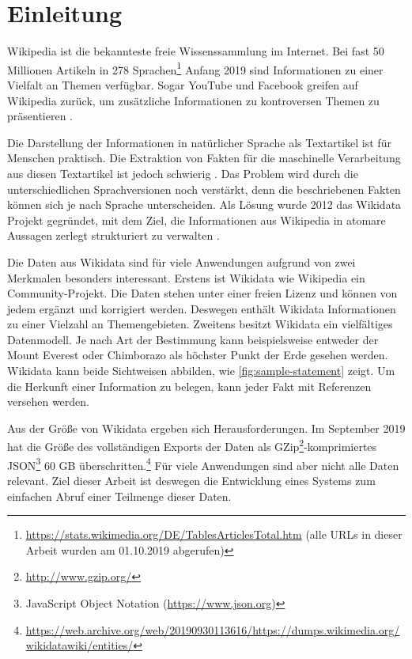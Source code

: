 %
\chapter{Einleitung}
\label{sec:intro}
Wikipedia ist die bekannteste freie Wissenssammlung im Internet.
Bei fast 50 Millionen Artikeln in 278 Sprachen\footnote{\url{https://stats.wikimedia.org/DE/TablesArticlesTotal.htm} (alle URLs in dieser Arbeit wurden am 01.10.2019 abgerufen)} Anfang 2019 sind Informationen zu einer Vielfalt an Themen verfügbar.
Sogar YouTube und Facebook greifen auf Wikipedia zurück, um zusätzliche Informationen zu kontroversen Themen zu präsentieren \cite{youtube-facebook-wp}.

Die Darstellung der Informationen in natürlicher Sprache als Textartikel ist für Menschen praktisch.
Die Extraktion von Fakten für die maschinelle Verarbeitung aus diesen Textartikel ist jedoch schwierig \cite{oie-errors,extract-rel-ibm}.
Das Problem wird durch die unterschiedlichen Sprachversionen noch verstärkt, denn die beschriebenen Fakten können sich je nach Sprache unterscheiden.
Als Lösung wurde 2012 das Wikidata Projekt gegründet, mit dem Ziel, die Informationen aus Wikipedia in atomare Aussagen zerlegt strukturiert zu verwalten \cite{wikidata}.

Die Daten aus Wikidata sind für viele Anwendungen aufgrund von zwei Merkmalen besonders interessant.
Erstens ist Wikidata wie Wikipedia ein Community-Projekt.
Die Daten stehen unter einer freien Lizenz und können von jedem ergänzt und korrigiert werden.
Deswegen enthält Wikidata Informationen zu einer Vielzahl an Themengebieten.
Zweitens besitzt Wikidata ein vielfältiges Datenmodell.
Je nach Art der Bestimmung kann beispielsweise entweder der Mount Everest oder Chimborazo als höchster Punkt der Erde gesehen werden.
Wikidata kann beide Sichtweisen abbilden, wie \cref{fig:sample-statement} zeigt.
Um die Herkunft einer Information zu belegen, kann jeder Fakt mit Referenzen versehen werden.

Aus der Größe von Wikidata ergeben sich Herausforderungen.
Im September 2019 hat die Größe des vollständigen Exports der Daten als GZip\footnote{\url{http://www.gzip.org/}}-komprimiertes JSON\footnote{JavaScript Object Notation (\url{https://www.json.org})} 60 GB überschritten.\footnote{\url{https://web.archive.org/web/20190930113616/https://dumps.wikimedia.org/wikidatawiki/entities/}}
Für viele Anwendungen sind aber nicht alle Daten relevant.
Ziel dieser Arbeit ist deswegen die Entwicklung eines Systems zum einfachen Abruf einer Teilmenge dieser Daten.

